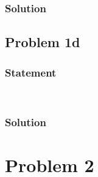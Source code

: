 \documentclass[conf]{new-aiaa}
\begin{document}

\subsubsection*{Solution} 





\subsection*{Problem 1d} 

\subsubsection*{Statement} 
\begin{center}
	 \\
\end{center}


\subsubsection*{Solution} 





\section*{Problem 2} 
\end{document}
